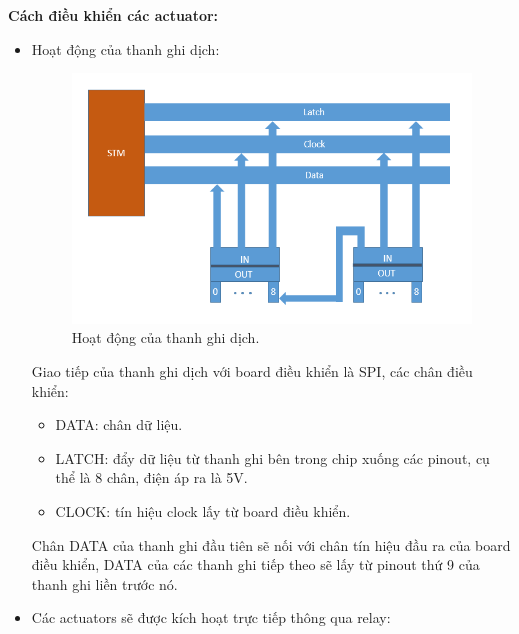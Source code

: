 \documentclass[a4paper,12pt,oneside]{article}
\begin{document}
\newpage
\textbf{Cách điều khiển các actuator:}
\begin{itemize}

\item Hoạt động của thanh ghi dịch:

\begin{figure}[H]
	\centering
	\includegraphics[scale=0.8]{hinh/stm_register.PNG}
	\caption{Hoạt động của thanh ghi dịch.}
\end{figure}

\noindent Giao tiếp của thanh ghi dịch với board điều khiển là SPI, các chân điều khiển:
\begin{itemize}
\item DATA: chân dữ liệu.
\item LATCH: đẩy dữ liệu từ thanh ghi bên trong chip xuống các pinout, cụ thể là 8 chân, điện áp ra là 5V.
\item CLOCK: tín hiệu clock lấy từ board điều khiển.
\end{itemize}

\noindent Chân DATA của thanh ghi đầu tiên sẽ nối với chân tín hiệu đầu ra của board điều khiển, DATA của các thanh ghi tiếp theo sẽ lấy từ pinout thứ 9 của thanh ghi liền trước nó.

\item Các actuators sẽ được kích hoạt trực tiếp thông qua relay:


\end{itemize}
\end{document}
